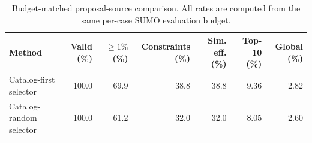\begin{table}[!ht]
    \caption{Budget-matched proposal-source comparison. All rates are computed from the same per-case SUMO evaluation budget.}
    \label{tab:proposal-source-comparison}
    \begin{center}
    \begin{tabular}{lrrrrrr}
        \hline
        Method & Valid (\%) & $\geq1\%$ (\%) & Constraints (\%) & Sim. eff. (\%) & Top-10 (\%) & Global (\%) \\
        \hline
        Catalog-first selector & 100.0 & 69.9 & 38.8 & 38.8 & 9.36 & 2.82 \\
        Catalog-random selector & 100.0 & 61.2 & 32.0 & 32.0 & 8.05 & 2.60 \\
        \hline
    \end{tabular}
    \end{center}
\end{table}
